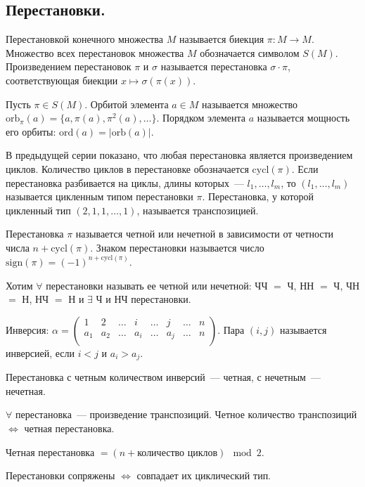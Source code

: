 \documentclass[12pt]{article}
\newcommand{\orb}{\text{orb}}
\newcommand{\ord}{\text{ord}}
\newcommand{\cycl}{\text{cycl}}
\begin{document}
	\subsection{Перестановки.}
	\begin{definition}
		Перестановкой конечного множества $M$ называется биекция $\pi : M \rightarrow M $. Множество всех перестановок множества $M$ обозначается символом $S(M)$. Произведением перестановок $\pi$ и $\sigma$ называется перестановка $\sigma \cdot \pi$, соответствующая биекции $x \mapsto \sigma (\pi (x))$.
	\end{definition}
	\begin{definition}
		Пусть $\pi \in S(M)$. Орбитой элемента $a \in M$ называется множество $\orb_{\pi}(a) = \{ a, \pi(a), \pi^2(a), \dots \}$. Порядком элемента $a$ называется мощность его орбиты: $\ord(a) = |\orb(a)|$.
	\end{definition}
	\begin{definition}
		В предыдущей серии показано, что любая перестановка является произведением циклов. Количество циклов в перестановке обозначается $\cycl(\pi)$. Если перестановка разбивается на циклы, длины которых~--- $l_1, \dots, l_m$, то $(l_1, \dots,l_m)$ называется цикленным типом перестановки $\pi$. Перестановка, у которой цикленный тип $(2, 1, 1, \dots, 1)$, называется транспозицией.
	\end{definition}
	\begin{definition}
		Перестановка $\pi$ называется четной или нечетной в зависимости от четности числа $n + \cycl(\pi)$. Знаком перестановки называется число $\text{sign}(\pi) = (-1)^{n + \cycl(\pi)}$.
	\end{definition}
	\begin{definition}
		Хотим $\forall$ перестановки называть ее четной или нечетной: ЧЧ $=$ Ч, НН $=$ Ч, ЧН $=$ Н, НЧ $=$ Н и $\exists$ Ч и НЧ перестановки.
	\end{definition}
	\begin{definition}
		Инверсия: $\alpha = \begin{pmatrix}
			1 & 2 & \dots & i & \dots & j & \dots & n\\
			a_1 & a_2 & \dots & a_i & \dots & a_j & \dots & n\\
		\end{pmatrix}$. Пара $(i, j)$ называется инверсией, если $i < j$ и $a_i > a_j$.
	\end{definition}
	\begin{definition}
		Перестановка с четным количеством инверсий~--- четная, с нечетным~--- нечетная.
	\end{definition}
	\begin{note}
		$\forall$ перестановка~--- произведение транспозиций. Четное количество транспозиций $\Leftrightarrow$ четная перестановка.
	\end{note}
	\begin{definition}
		Четная перестановка $= (n + \text{количество циклов}) \mod{2}$.
	\end{definition}
	\begin{theorem}
		Перестановки сопряжены $\Leftrightarrow$ совпадает их циклический тип.
	\end{theorem}
\end{document}
